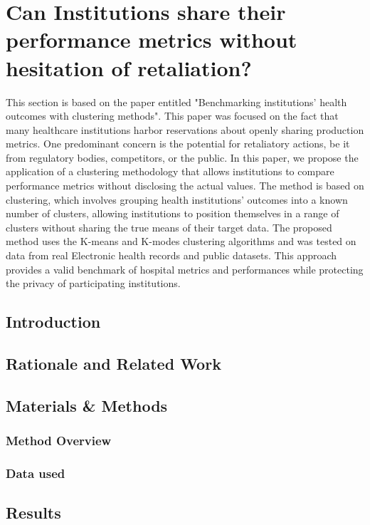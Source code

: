 \section{Can Institutions share their performance metrics without hesitation of retaliation?}\label{subsec:benchmark}
This section is based on the paper entitled "Benchmarking institutions' health outcomes with clustering methods". This paper was focused on the fact that many healthcare institutions harbor reservations about openly sharing production metrics. One predominant concern is the potential for retaliatory actions, be it from regulatory bodies, competitors, or the public. In this paper, we propose the application of a clustering methodology that allows institutions to compare performance metrics without disclosing the actual values. The method is based on clustering, which involves grouping health institutions' outcomes into a known number of clusters, allowing institutions to position themselves in a range of clusters without sharing the true means of their target data. The proposed method uses the K-means and K-modes clustering algorithms and was tested on data from real Electronic health records and public datasets. This approach provides a valid benchmark of hospital metrics and performances while protecting the privacy of participating institutions. 
\subsection{Introduction}

\subsection{Rationale and Related Work}

\subsection{Materials \& Methods}
\subsubsection{Method Overview}

\subsubsection{Data used}

\subsection{Results}

